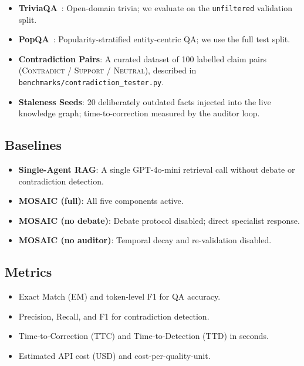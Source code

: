 \documentclass{article}
\begin{document}
\begin{itemize}
  \item \textbf{TriviaQA}~\cite{joshi2017triviaqa}: Open-domain trivia; we evaluate
    on the \texttt{unfiltered} validation split.
  \item \textbf{PopQA}~\cite{mallen2022popqa}: Popularity-stratified entity-centric QA;
    we use the full test split.
  \item \textbf{Contradiction Pairs}: A curated dataset of 100 labelled
    claim pairs (\textsc{Contradict} / \textsc{Support} / \textsc{Neutral}),
    described in \texttt{benchmarks/contradiction\_tester.py}.
  \item \textbf{Staleness Seeds}: 20 deliberately outdated facts injected into
    the live knowledge graph; time-to-correction measured by the auditor loop.
\end{itemize}

\subsection{Baselines}

\begin{itemize}
  \item \textbf{Single-Agent RAG}: A single GPT-4o-mini retrieval call without
    debate or contradiction detection.
  \item \textbf{MOSAIC (full)}: All five components active.
  \item \textbf{MOSAIC (no debate)}: Debate protocol disabled; direct specialist
    response.
  \item \textbf{MOSAIC (no auditor)}: Temporal decay and re-validation disabled.
\end{itemize}

\subsection{Metrics}

\begin{itemize}
  \item Exact Match (EM) and token-level F1 for QA accuracy.
  \item Precision, Recall, and F1 for contradiction detection.
  \item Time-to-Correction (TTC) and Time-to-Detection (TTD) in seconds.
  \item Estimated API cost (USD) and cost-per-quality-unit.
\end{itemize}
\end{document}

